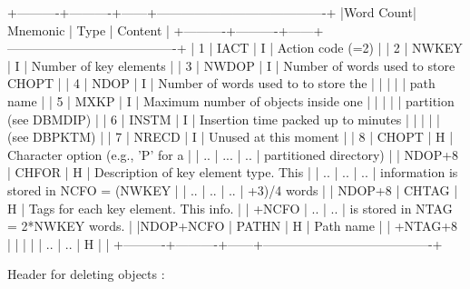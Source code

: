 \begin{XMP}
 +----------+----------+------+----------------------------------------+
 |Word Count| Mnemonic | Type |         Content                        |
 +----------+----------+------+----------------------------------------+
 |        1 |   IACT   |   I  | Action code (=2)                       |
 |        2 |  NWKEY   |   I  | Number of key elements                 |
 |        3 |  NWDOP   |   I  | Number of words used to store CHOPT    |
 |        4 |   NDOP   |   I  | Number of words used to to store the   |
 |          |          |      | path name                              |
 |        5 |   MXKP   |   I  | Maximum number of objects inside one   |
 |          |          |      | partition (see DBMDIP)                 |
 |        6 |  INSTM   |   I  | Insertion time packed up to minutes    |
 |          |          |      | (see DBPKTM)                           |
 |        7 |  NRECD   |   I  | Unused at this moment                  |
 |        8 |  CHOPT   |   H  | Character option (e.g., 'P' for a      |
 |       .. |   ...    |  ..  | partitioned directory)                 |
 |   NDOP+8 |  CHFOR   |   H  | Description of key element type. This  |
 |       .. |     ..   |  ..  | information is stored in NCFO = (NWKEY |
 |       .. |     ..   |  ..  | +3)/4 words                            |
 |   NDOP+8 |  CHTAG   |   H  | Tags for each key element. This info.  |
 |    +NCFO |     ..   |  ..  | is stored in NTAG = 2*NWKEY words.     |
 |NDOP+NCFO |  PATHN   |   H  | Path name                              |
 |  +NTAG+8 |          |      |                                        |
 |       .. |     ..   |   H  |                                        |
 +----------+----------+------+----------------------------------------+

   Header for deleting objects :


\end{XMP}

